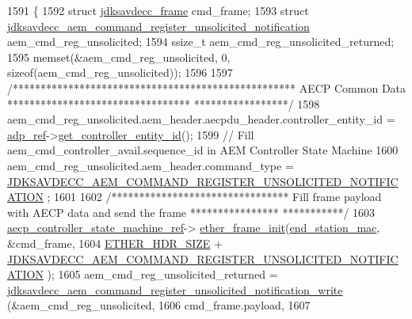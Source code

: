 \begin{DoxyCode}
1591 \{
1592     \textcolor{keyword}{struct }\hyperlink{structjdksavdecc__frame}{jdksavdecc\_frame} cmd\_frame;
1593     \textcolor{keyword}{struct }\hyperlink{structjdksavdecc__aem__command__register__unsolicited__notification}{jdksavdecc\_aem\_command\_register\_unsolicited\_notification}
       aem\_cmd\_reg\_unsolicited;
1594     ssize\_t aem\_cmd\_reg\_unsolicited\_returned;
1595     memset(&aem\_cmd\_reg\_unsolicited, 0, \textcolor{keyword}{sizeof}(aem\_cmd\_reg\_unsolicited));
1596 
1597     \textcolor{comment}{/*************************************************** AECP Common Data *********************************
      *****************/}
1598     aem\_cmd\_reg\_unsolicited.aem\_header.aecpdu\_header.controller\_entity\_id = 
      \hyperlink{classavdecc__lib_1_1end__station__imp_a0b7b5ce956637a18c695ba20f2d4908c}{adp\_ref}->\hyperlink{classavdecc__lib_1_1adp_a0c0959a46658c0a22e9530334b2912da}{get\_controller\_entity\_id}();
1599     \textcolor{comment}{// Fill aem\_cmd\_controller\_avail.sequence\_id in AEM Controller State Machine}
1600     aem\_cmd\_reg\_unsolicited.aem\_header.command\_type = 
      \hyperlink{group__command_ga3e96622fb21f8a15740b8a3c6536dd00}{JDKSAVDECC\_AEM\_COMMAND\_REGISTER\_UNSOLICITED\_NOTIFICATION}
      ;
1601 
1602     \textcolor{comment}{/******************************** Fill frame payload with AECP data and send the frame ****************
      ***********/}
1603     \hyperlink{namespaceavdecc__lib_a0b1b5aea3c0490f77cbfd9178af5be22}{aecp\_controller\_state\_machine\_ref}->
      \hyperlink{classavdecc__lib_1_1aecp__controller__state__machine_a86ff947c5e6b799cfb877d3767bfa1f9}{ether\_frame\_init}(\hyperlink{classavdecc__lib_1_1end__station__imp_a0e9fa7b31d903107ff9e7aac9dac172d}{end\_station\_mac}, &cmd\_frame,
1604                                                         \hyperlink{namespaceavdecc__lib_a6c827b1a0d973e18119c5e3da518e65ca9512ad9b34302ba7048d88197e0a2dc0}{ETHER\_HDR\_SIZE} + 
      \hyperlink{group__command_ga3e96622fb21f8a15740b8a3c6536dd00}{JDKSAVDECC\_AEM\_COMMAND\_REGISTER\_UNSOLICITED\_NOTIFICATION}
      );
1605     aem\_cmd\_reg\_unsolicited\_returned = 
      \hyperlink{group__command__register__unsolicited__notification_ga29ce701c6875bebea0eba0cd03684c51}{jdksavdecc\_aem\_command\_register\_unsolicited\_notification\_write}
      (&aem\_cmd\_reg\_unsolicited,
1606                                                                                                       
      cmd\_frame.payload,
1607                                                                                                       

\end{DoxyCode}
